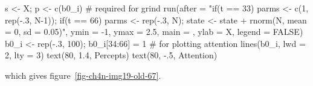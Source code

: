 \documentclass[
  a4paper,
  DIV=11,
  numbers=noendperiod,
  oneside]{scrreprt}
\newenvironment{Shaded}{}{}
\newcommand{\AttributeTok}[1]{\textcolor[rgb]{0.84,0.23,0.29}{#1}}
\newcommand{\CommentTok}[1]{\textcolor[rgb]{0.42,0.45,0.49}{#1}}
\newcommand{\ConstantTok}[1]{\textcolor[rgb]{0.00,0.36,0.77}{#1}}
\newcommand{\DecValTok}[1]{\textcolor[rgb]{0.00,0.36,0.77}{#1}}
\newcommand{\FloatTok}[1]{\textcolor[rgb]{0.00,0.36,0.77}{#1}}
\newcommand{\FunctionTok}[1]{\textcolor[rgb]{0.44,0.26,0.76}{#1}}
\newcommand{\NormalTok}[1]{\textcolor[rgb]{0.14,0.16,0.18}{#1}}
\newcommand{\OtherTok}[1]{\textcolor[rgb]{0.44,0.26,0.76}{#1}}
\newcommand{\SpecialCharTok}[1]{\textcolor[rgb]{0.00,0.36,0.77}{#1}}
\newcommand{\StringTok}[1]{\textcolor[rgb]{0.01,0.18,0.38}{#1}}
\begin{document}
\begin{Shaded}
\begin{Highlighting}[]
\NormalTok{s }\OtherTok{\textless{}{-}}\NormalTok{ X; p }\OtherTok{\textless{}{-}} \FunctionTok{c}\NormalTok{(b0\_i) }\CommentTok{\# required for grind}
\FunctionTok{run}\NormalTok{(}\AttributeTok{after =} \StringTok{"if(t == 33) parms \textless{}{-} c(1, rep({-}.3, N{-}1));}
\StringTok{            if(t == 66) parms \textless{}{-} rep({-}.3, N);}
\StringTok{            state \textless{}{-} state + rnorm(N, mean = 0, sd = 0.05)"}\NormalTok{,}
    \AttributeTok{ymin =} \SpecialCharTok{{-}}\DecValTok{1}\NormalTok{, }\AttributeTok{ymax =} \FloatTok{2.5}\NormalTok{, }\AttributeTok{main =} \StringTok{\textquotesingle{}\textquotesingle{}}\NormalTok{, }\AttributeTok{ylab =} \StringTok{\textquotesingle{}X\textquotesingle{}}\NormalTok{, }\AttributeTok{legend =} \ConstantTok{FALSE}\NormalTok{)}
\NormalTok{b0\_i }\OtherTok{\textless{}{-}} \FunctionTok{rep}\NormalTok{(}\SpecialCharTok{{-}}\NormalTok{.}\DecValTok{3}\NormalTok{, }\DecValTok{100}\NormalTok{); b0\_i[}\DecValTok{34}\SpecialCharTok{:}\DecValTok{66}\NormalTok{] }\OtherTok{=} \DecValTok{1} \CommentTok{\# for plotting attention}
\FunctionTok{lines}\NormalTok{(b0\_i, }\AttributeTok{lwd =} \DecValTok{2}\NormalTok{, }\AttributeTok{lty =} \DecValTok{3}\NormalTok{)}
\FunctionTok{text}\NormalTok{(}\DecValTok{80}\NormalTok{, }\FloatTok{1.4}\NormalTok{, }\StringTok{\textquotesingle{}Percepts\textquotesingle{}}\NormalTok{)}
\FunctionTok{text}\NormalTok{(}\DecValTok{80}\NormalTok{, }\SpecialCharTok{{-}}\NormalTok{.}\DecValTok{5}\NormalTok{, }\StringTok{\textquotesingle{}Attention\textquotesingle{}}\NormalTok{)}
\end{Highlighting}
\end{Shaded}

which gives figure~\ref{fig-ch4n-img19-old-67}.
\end{document}
